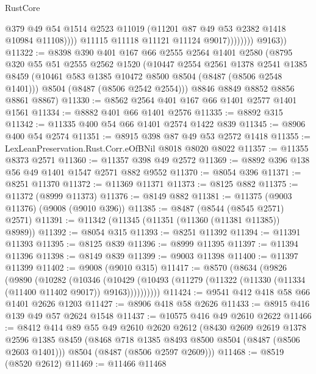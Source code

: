 \begin{lexlean}{RustCore}
\begin{coremodule}
                              @379
                              @49
                              @54
                              @1514
                              @2523
                              @11019
                              (@11201 @87 @49 @53 @2382 @1418 @10984 @11108))))
                        @11115
                        @11118
                        @11121
                        @11124
                        @9017))))))))
        @9163))
@11322 := @8398
    @390
    @401
    @167
    @66
    @2555
    @2564
    @1401
    @2580
    (@8795
      @320
      @55
      @51
      @2555
      @2562
      @1520
      (@10447
        @2554
        @2561
        @1378
        @2541
        @1385
        @8459
        (@10461 @583 @1385 @10472 @8500 @8504 (@8487 (@8506 @2548 @1401)))
        @8504
        (@8487 (@8506 @2542 @2554)))
      @8846
      @8849
      @8852
      @8856
      @8861
      @8867)
@11330 := @8562 @2564 @401 @167 @66 @1401 @2577 @1401 @1561
@11334 := @8882 @401 @66 @1401 @2576
@11335 := @8892 @315
@11342 := @11335 @400 @54 @66 @1401 @2574 @1422 @839
@11345 := @8906 @400 @54 @2574
@11351 := @8915 @398 @87 @49 @53 @2572 @1418
@11355 := LexLeanPreservation.Rust.Corr.eOfBNil @8018 @8020 @8022
@11357 := @11355 @8373 @2571
@11360 := @11357 @398 @49 @2572
@11369 := @8892 @396 @138 @56 @49 @1401 @1547 @2571 @882 @9552
@11370 := @8054 @396
@11371 := @8251 @11370
@11372 := @11369 @11371
@11373 := @8125 @882
@11375 := @11372 (@8999 @11373)
@11376 := @8149 @882
@11381 := @11375 (@9003 @11376) (@9008 (@9010 @396))
@11385 := @8487 (@8544 (@8545 @2571) @2571)
@11391 := @11342 (@11345 (@11351 (@11360 (@11381 @11385)) @8989))
@11392 := @8054 @315
@11393 := @8251 @11392
@11394 := @11391 @11393
@11395 := @8125 @839
@11396 := @8999 @11395
@11397 := @11394 @11396
@11398 := @8149 @839
@11399 := @9003 @11398
@11400 := @11397 @11399
@11402 := @9008 (@9010 @315)
@11417 := @8570
    (@8634
      (@9826
        (@9890
          (@10282
            (@10346
              (@10429 (@10493 (@11279 (@11322 (@11330 (@11334 (@11400 @11402 @9017)) @9163))))))))))
@11424 := @9541 @412 @418 @58 @66 @1401 @2626 @1203
@11427 := @8906 @418 @58 @2626
@11433 := @8915 @416 @139 @49 @57 @2624 @1548
@11437 := @10575 @416 @49 @2610 @2622
@11466 := @8412
    @414
    @89
    @55
    @49
    @2610
    @2620
    @2612
    (@8430
      @2609
      @2619
      @1378
      @2596
      @1385
      @8459
      (@8468 @718 @1385 @8493 @8500 @8504 (@8487 (@8506 @2603 @1401)))
      @8504
      (@8487 (@8506 @2597 @2609)))
@11468 := @8519 (@8520 @2612)
@11469 := @11466 @11468

\end{coremodule}
\end{lexlean}
